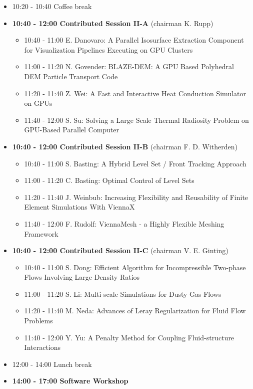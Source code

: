 \documentclass[10pt, A4]{article}%
\begin{document}
\begin{itemize}
\begin{itemize}
  \end{itemize}
  \item 10:20 - 10:40 Coffee break
  \item {\bf 10:40 - 12:00 Contributed Session II-A} (chairman K. Rupp) 
  \begin{itemize}
    \item 10:40 - 11:00 {E. Danovaro}: {A Parallel Isosurface Extraction Component for Visualization Pipelines Executing on GPU Clusters}
    \item 11:00 - 11:20 {N. Govender}: {BLAZE-DEM: A GPU Based Polyhedral DEM Particle Transport Code}
    \item 11:20 - 11:40 {Z. Wei}: {A Fast and Interactive Heat Conduction Simulator on GPUs}
    \item 11:40 - 12:00 {S. Su}: {Solving a Large Scale Thermal Radiosity Problem on GPU-Based Parallel Computer}
  \end{itemize}
  \item {\bf 10:40 - 12:00 Contributed Session II-B} (chairman F. D. Witherden) 
  \begin{itemize}
    \item 10:40 - 11:00 {S. Basting}: {A Hybrid Level Set / Front Tracking Approach}
    \item 11:00 - 11:20 {C. Basting}: {Optimal Control of Level Sets}
    \item 11:20 - 11:40 {J. Weinbub}: {Increasing Flexibility and Reusability of Finite Element Simulations With ViennaX}
    \item 11:40 - 12:00 {F. Rudolf}: {ViennaMesh - a Highly Flexible Meshing Framework}
  \end{itemize}
  \item {\bf 10:40 - 12:00 Contributed Session II-C} (chairman V. E. Ginting) 
  \begin{itemize}
    \item 10:40 - 11:00 {S. Dong}: {Efficient Algorithm for Incompressible Two-phase Flows Involving Large Density Ratios}
    \item 11:00 - 11:20 {S. Li}: {Multi-scale Simulations for Dusty Gas Flows}
    \item 11:20 - 11:40 {M. Neda}: {Advances of Leray Regularization for Fluid Flow Problems}
    \item 11:40 - 12:00 {Y. Yu}: {A Penalty Method for Coupling Fluid-structure Interactions}
  \end{itemize}
  \item 12:00 - 14:00 Lunch break
  \newpage
  \item {\bf 14:00 - 17:00 Software Workshop}

\end{itemize}
\end{document}
